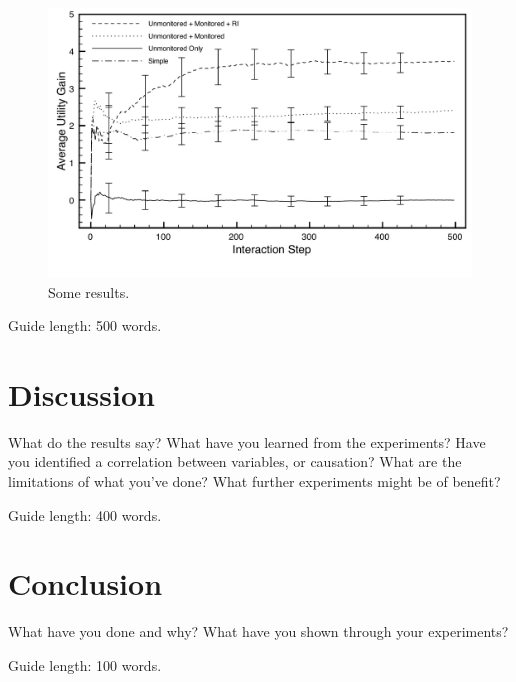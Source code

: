 \documentclass{csfourzero}
\begin{document}
\begin{figure}
\centerline{\includegraphics[width=5in]{basic-data-errors}}
\caption{Some results.}\label{fig:data}
\end{figure}

Guide length: 500 words.

\section{Discussion}
\label{sec:discuss}

What do the results say? What have you learned from the
experiments? Have you identified a correlation between variables, or
causation? What are the limitations of what you've done? What further
experiments might be of benefit?

Guide length: 400 words.

\section{Conclusion}
\label{sec:conc}

What have you done and why? What have you shown through your
experiments?

Guide length: 100 words.


\end{document}
